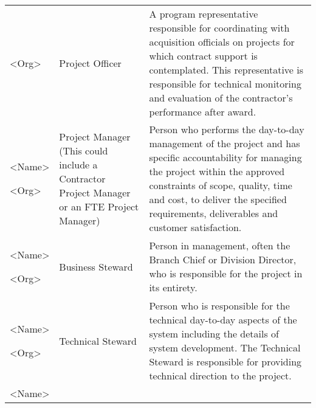 \documentclass[a4paper, 11pt]{article}
\begin{document}
\begin{longtable}[]{@{}lll@{}}
\begin{minipage}[t]{0.30\columnwidth}
\textless{}Org\textgreater{}\strut
\end{minipage} & \begin{minipage}[t]{0.30\columnwidth}\raggedright
Project Officer\strut
\end{minipage} & \begin{minipage}[t]{0.30\columnwidth}\raggedright
A program representative responsible for coordinating with acquisition
officials on projects for which contract support is contemplated. This
representative is responsible for technical monitoring and evaluation of
the contractor's performance after award.\strut
\end{minipage}\tabularnewline
\begin{minipage}[t]{0.30\columnwidth}\raggedright
\textless{}Name\textgreater{}

\textless{}Org\textgreater{}\strut
\end{minipage} & \begin{minipage}[t]{0.30\columnwidth}\raggedright
Project Manager (This could include a Contractor Project Manager or an
FTE Project Manager)\strut
\end{minipage} & \begin{minipage}[t]{0.30\columnwidth}\raggedright
Person who performs the day-to-day management of the project and has
specific accountability for managing the project within the approved
constraints of scope, quality, time and cost, to deliver the specified
requirements, deliverables and customer satisfaction.\strut
\end{minipage}\tabularnewline
\begin{minipage}[t]{0.30\columnwidth}\raggedright
\textless{}Name\textgreater{}

\textless{}Org\textgreater{}\strut
\end{minipage} & \begin{minipage}[t]{0.30\columnwidth}\raggedright
Business Steward\strut
\end{minipage} & \begin{minipage}[t]{0.30\columnwidth}\raggedright
Person in management, often the Branch Chief or Division Director, who
is responsible for the project in its entirety.\strut
\end{minipage}\tabularnewline
\begin{minipage}[t]{0.30\columnwidth}\raggedright
\textless{}Name\textgreater{}

\textless{}Org\textgreater{}\strut
\end{minipage} & \begin{minipage}[t]{0.30\columnwidth}\raggedright
Technical Steward\strut
\end{minipage} & \begin{minipage}[t]{0.30\columnwidth}\raggedright
Person who is responsible for the technical day-to-day aspects of the
system including the details of system development. The Technical
Steward is responsible for providing technical direction to the
project.\strut
\end{minipage}\tabularnewline
\begin{minipage}[t]{0.30\columnwidth}\raggedright
\textless{}Name\textgreater{}


\end{minipage}
\end{longtable}
\end{document}
